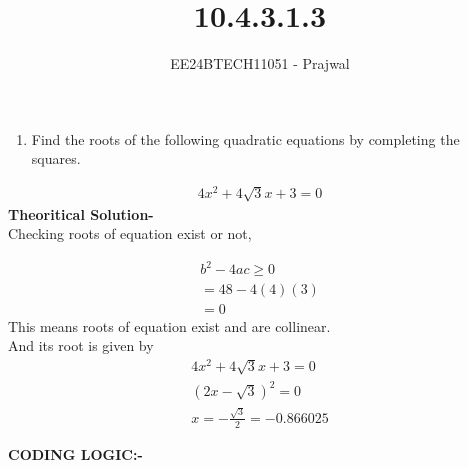 \documentclass[journal]{IEEEtran}
\numberwithin{equation}{enumi}
\numberwithin{figure}{enumi}
\begin{document}

\title{10.4.3.1.3}
\author{EE24BTECH11051 - Prajwal}
{\let\newpage\relax\maketitle}
\begin{enumerate}
\item Find the roots of the following quadratic equations by completing the squares.
\end{enumerate}
\begin{align}
4x^2 + 4\sqrt{3}x + 3 = 0
\end{align}
\textbf{Theoritical Solution-}\\
Checking roots of equation exist or not,

\begin{align}
b^2 - 4ac \geq 0 \\
= 48 - 4(4)(3)\\
= 0 
\end{align}
This means roots of equation exist and are collinear.\\
And its root is given by 
\begin{align}
4x^2 + 4\sqrt{3}x + 3 = 0 \\
(2x-\sqrt{3})^2 = 0 \\
x = -\frac{\sqrt{3}}{2}=-0.866025
\end{align} 

\textbf{CODING LOGIC:-}
\end{document}
